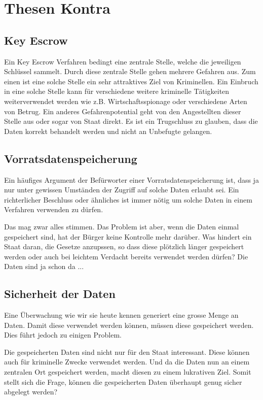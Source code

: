 \section*{Thesen Kontra}

\subsection*{Key Escrow}
Ein Key Escrow Verfahren bedingt eine zentrale Stelle, welche die jeweiligen
Schlüssel sammelt.
Durch diese zentrale Stelle gehen mehrere Gefahren aus. Zum einen ist eine
solche Stelle ein sehr attraktives Ziel von Kriminellen. Ein Einbruch in eine
solche Stelle kann für verschiedene weitere kriminelle Tätigkeiten
weiterverwendet werden wie z.B. Wirtschaftsspionage oder verschiedene Arten
von Betrug.
Ein anderes Gefahrenpotential geht von den Angestellten dieser Stelle aus oder
sogar von Staat direkt. Es ist ein Trugschluss zu glauben, dass die Daten
korrekt behandelt werden und nicht an Unbefugte gelangen.

\subsection*{Vorratsdatenspeicherung}
Ein häufiges Argument der Befürworter einer Vorratsdatenspeicherung ist, dass ja nur unter gewissen Umständen der Zugriff auf solche Daten erlaubt sei. Ein richterlicher Beschluss oder ähnliches ist immer nötig um solche Daten in einem Verfahren verwenden zu dürfen.

Das mag zwar alles stimmen. Das Problem ist aber, wenn die Daten einmal gespeichert sind, hat der Bürger keine Kontrolle mehr darüber. Was hindert ein Staat daran, die Gesetze anzupssen, so dass diese plötzlich länger gespeichert werden oder auch bei leichtem Verdacht bereits verwendet werden dürfen? Die Daten sind ja schon da ...

\subsection*{Sicherheit der Daten}
Eine Überwachung wie wir sie heute kennen generiert eine grosse Menge an Daten. Damit diese verwendet werden können, müssen diese gespeichert werden. Dies führt jedoch zu einigen Problem.

Die gespeicherten Daten sind nicht nur für den Staat interessant. Diese können auch für kriminelle Zwecke verwendet werden. Und da die Daten nun an einem zentralen Ort gespeichert werden, macht diesen zu einem lukrativen Ziel. Somit stellt sich die Frage, können die gespeicherten Daten überhaupt genug sicher abgelegt werden?

